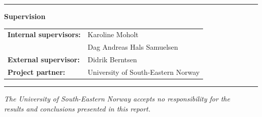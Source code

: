 \begin{titlepage}
    \noindent\rule{\textwidth}{0.4pt}
    \vspace{0.3cm}
    
    {\large\bfseries Supervision}
    
    \vspace{0.5cm}
    
    \begin{tabular}{@{}p{4.5cm}l@{}}
        \textbf{Internal supervisors:} & Karoline Moholt\\
                                       & Dag Andreas Hals Samuelsen\\[0.2cm]
        \textbf{External supervisor:}  & Didrik Berntsen\\[0.2cm]
        \textbf{Project partner:}      & University of South-Eastern Norway\\
    \end{tabular}
    
    \vfill
    
    \noindent\rule{\textwidth}{0.4pt}
    \vspace{0.3cm}
    
    \begin{center}
        \small\textit{The University of South-Eastern Norway accepts no responsibility for the\\
        results and conclusions presented in this report.}
    \end{center}
    
\end{titlepage}